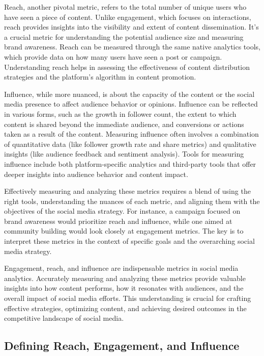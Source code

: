 \documentclass[
]{book}
\begin{document}
Reach, another pivotal metric, refers to the total number of unique users who have seen a piece of content. Unlike engagement, which focuses on interactions, reach provides insights into the visibility and extent of content dissemination. It's a crucial metric for understanding the potential audience size and measuring brand awareness. Reach can be measured through the same native analytics tools, which provide data on how many users have seen a post or campaign. Understanding reach helps in assessing the effectiveness of content distribution strategies and the platform's algorithm in content promotion.

Influence, while more nuanced, is about the capacity of the content or the social media presence to affect audience behavior or opinions. Influence can be reflected in various forms, such as the growth in follower count, the extent to which content is shared beyond the immediate audience, and conversions or actions taken as a result of the content. Measuring influence often involves a combination of quantitative data (like follower growth rate and share metrics) and qualitative insights (like audience feedback and sentiment analysis). Tools for measuring influence include both platform-specific analytics and third-party tools that offer deeper insights into audience behavior and content impact.

Effectively measuring and analyzing these metrics requires a blend of using the right tools, understanding the nuances of each metric, and aligning them with the objectives of the social media strategy. For instance, a campaign focused on brand awareness would prioritize reach and influence, while one aimed at community building would look closely at engagement metrics. The key is to interpret these metrics in the context of specific goals and the overarching social media strategy.

Engagement, reach, and influence are indispensable metrics in social media analytics. Accurately measuring and analyzing these metrics provide valuable insights into how content performs, how it resonates with audiences, and the overall impact of social media efforts. This understanding is crucial for crafting effective strategies, optimizing content, and achieving desired outcomes in the competitive landscape of social media.

\hypertarget{defining-reach-engagement-and-influence}{%
\subsection*{Defining Reach, Engagement, and Influence}\label{defining-reach-engagement-and-influence}}
\end{document}
